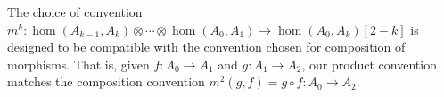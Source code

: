 
The choice of convention $m^k:\hom(A_{k-1}, A_k)\otimes \cdots \otimes \hom(A_0, A_1)\to \hom(A_0, A_k)[2-k]$ is designed to be compatible with the convention chosen for composition of morphisms. That is, given $f: A_0\to A_1$ and $g:A_1\to A_2$, our product convention matches the composition convention  $m^2(g, f)= g\circ f: A_0\to A_2$.